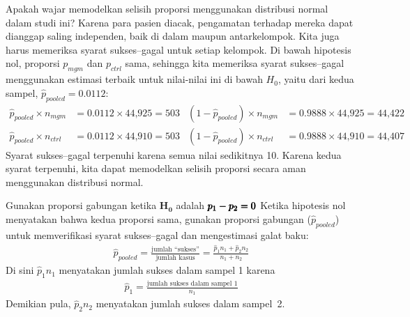 \begin{examplewrap}
\begin{nexample}{Apakah wajar memodelkan selisih
    proporsi menggunakan distribusi normal dalam
    studi ini?}
  \label{condFormammogramStudySummaryTableNormalInference}%
  Karena para pasien diacak, pengamatan terhadap mereka dapat dianggap
  saling independen, baik di dalam maupun antarkelompok.
  Kita juga harus memeriksa syarat sukses--gagal untuk setiap kelompok.
  Di bawah hipotesis nol, proporsi $p_{mgm}$
  dan $p_{ctrl}$ sama, sehingga kita memeriksa syarat sukses--gagal
  menggunakan estimasi terbaik untuk nilai-nilai ini di bawah $H_0$,
  yaitu  dari kedua sampel,
  $\hat{p}_{\textit{pooled}} = 0.0112$:
  \begin{align*}
  \hat{p}_{\textit{pooled}} \times n_{mgm}
      &= 0.0112 \times \text{44,925} = 503
    & (1 - \hat{p}_{\textit{pooled}}) \times n_{mgm}
      &= 0.9888 \times \text{44,925} = \text{44,422} \\
  \hat{p}_{\textit{pooled}} \times n_{ctrl}
      &= 0.0112 \times \text{44,910} = 503
    & (1 - \hat{p}_{\textit{pooled}}) \times n_{ctrl}
      &= 0.9888 \times \text{44,910} = \text{44,407}
  \end{align*}
  Syarat sukses--gagal terpenuhi karena
  semua nilai sedikitnya 10.
  Karena kedua syarat terpenuhi, kita dapat memodelkan
  selisih proporsi secara aman menggunakan distribusi
  normal.
\end{nexample}
\end{examplewrap}

\begin{onebox}{Gunakan proporsi gabungan ketika
    $\pmb{H_0}$ adalah $\pmb{\MakeLowercase{p_1 - p_2 = 0}}$}
  Ketika hipotesis nol menyatakan bahwa kedua proporsi sama,
  gunakan proporsi gabungan ($\hat{p}_{\textit{pooled}}$)
  untuk memverifikasi
  syarat sukses--gagal dan mengestimasi galat baku:
  \begin{eqnarray*}
  \hat{p}_{\textit{pooled}}
    = \frac{\text{jumlah ``sukses''}}
      {\text{jumlah kasus}}
    = \frac{\hat{p}_1 n_1 + \hat{p}_2 n_2}{n_1 + n_2}
  \end{eqnarray*}
  Di sini $\hat{p}_1 n_1$ menyatakan jumlah sukses dalam
  sampel 1 karena
  \begin{eqnarray*}
  \hat{p}_1
    = \frac{\text{jumlah sukses dalam sampel 1}}{n_1}
  \end{eqnarray*}
  Demikian pula, $\hat{p}_2 n_2$ menyatakan jumlah
  sukses dalam sampel~2.
\end{onebox}

